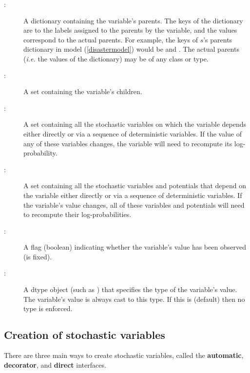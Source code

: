 \documentclass[]{jss}
\begin{document}
\begin{description}
    \item[:] A dictionary containing the variable's parents. The keys of the dictionary are to the labels assigned to the parents by the variable, and the values correspond to the actual parents. For example, the keys of $s$'s parents dictionary in model (\ref{disastermodel}) would be  and . The actual parents (\emph{i.e.} the values of the dictionary) may be of any class or type.
    \item[:] A set containing the variable's children.
    \item[:] A set containing all the stochastic variables on which the variable depends either directly or via a sequence of deterministic variables. If the value of any of these variables changes, the variable will need to recompute its log-probability.
    \item[:] A set containing all the stochastic variables and potentials that depend on the variable either directly or via a sequence of deterministic variables. If the variable's value changes, all of these variables and potentials will need to recompute their log-probabilities.
    \item[:] A flag (boolean) indicating whether the variable's value has been observed (is fixed).
    \item[:] A  dtype object (such as ) that specifies the type of the variable's value. The variable's value is always cast to this type. If this is  (default) then no type is enforced.
\end{description}

\subsection{Creation of stochastic variables}
There are three main ways to create stochastic variables, called the \textbf{automatic}, \textbf{decorator}, and \textbf{direct} interfaces.
\end{document}
